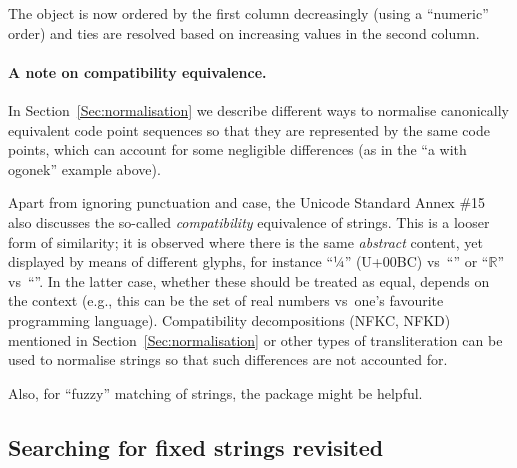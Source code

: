 \documentclass[nojss]{jss}
\begin{document}
The object is now ordered by the first column decreasingly
(using a ``numeric'' order) and ties are resolved based on increasing
values in the second column.


\paragraph{A note on compatibility equivalence.}
In Section~\ref{Sec:normalisation} we describe different ways to normalise
canonically equivalent code point sequences so that they are
represented by the same code points, which can account for some negligible
differences (as in the ``a with ogonek'' example above).

Apart from ignoring punctuation and case, the Unicode Standard Annex \#15 \citep{usa15:normalization}
also discusses the so-called \textit{compatibility} equivalence of strings.
This is a looser form of similarity; it is observed where
there is the same \textit{abstract} content, yet displayed
by means of different glyphs, for instance ``¼'' (U+00BC) vs~``''
or ``$\mathbb{R}$'' vs~``''.
In the latter case, whether these should be treated as equal,
depends on the context (e.g., this can be the set of real numbers
vs~one's favourite programming language).
Compatibility decompositions (NFKC, NFKD)
mentioned in Section~\ref{Sec:normalisation}
or other types of transliteration can be used to normalise strings so that
such differences are not accounted for.

Also, for ``fuzzy'' matching of strings,
the  package \citep{stringdist} might be helpful.













\subsection{Searching for fixed strings revisited}
\end{document}
